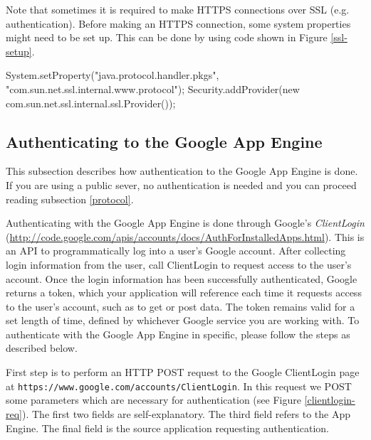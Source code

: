 Note that sometimes it is required to make HTTPS connections over SSL
(e.g. authentication). Before making an HTTPS connection, some system
properties might need to be set up. This can be done by using code shown in
Figure \ref{ssl-setup}.

\begin{figure*}[ht] %
\begin{center}
\begin{code}
System.setProperty("java.protocol.handler.pkgs",
                        "com.sun.net.ssl.internal.www.protocol");
Security.addProvider(new com.sun.net.ssl.internal.ssl.Provider());
\end{code}
\caption{Setting up SSL.\label{ssl-setup}}
\end{center}
\end{figure*}

\subsection{Authenticating to the Google App Engine}
\label{auth}
This subsection describes how authentication to the Google App Engine is done. If
you are using a public sever, no authentication is needed and you can proceed
reading subsection \ref{protocol}.

Authenticating with the Google App Engine is done through Google's
\emph{ClientLogin}
(\url{http://code.google.com/apis/accounts/docs/AuthForInstalledApps.html}).
This is an API to programmatically log into a user's Google account. After
collecting login information from the user, call ClientLogin to request access
to
the user's account. Once the login information has been successfully
authenticated, Google returns a token, which your application will reference
each
time it requests access to the user's account, such as to get or post data. The
token remains valid for a set length of time, defined by whichever Google
service
you are working with. To authenticate with the Google App Engine in specific,
please follow the steps as described below.

First step is to perform an HTTP POST request to the Google ClientLogin page at
\texttt{https://www.google.com/accounts/ClientLogin}. In this request we POST
some parameters which are necessary for authentication (see Figure
\ref{clientlogin-req}). The first two fields are self-explanatory. The third
field refers to the App Engine. The final field is the source application
requesting authentication.

